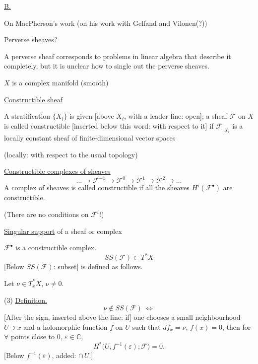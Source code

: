 \underline{B.}

On MacPherson's work (on his work with Gelfand and Vilonen(?))

Perverse sheaves?

A perverse sheaf corresponds to problems in linear algebra that describe it completely,
but it is unclear how to single out the perverse sheaves.

$X$ is a complex manifold (smooth)

\underline{Constructible sheaf}

A stratification $\{X_i\}$ is given [above $X_i$, with a leader line: open];
a sheaf $\mathcal{F}$ on $X$ is called constructible
[inserted below this word: with respect to it]
if $\mathcal{F}|_{X_i}$ is a locally constant sheaf of finite-dimensional vector spaces

(locally: with respect to the usual topology)

\underline{Constructible complexes of sheaves}
\begin{equation*}
\ldots\longrightarrow\mathcal{F}^{-1}
\longrightarrow\mathcal{F}^{0}
\longrightarrow\mathcal{F}^{1}
\longrightarrow\mathcal{F}^{2}\longrightarrow\ldots \tag{1}
\end{equation*}
A complex of sheaves is called constructible if all the sheaves
$H^{i}(\mathcal{F}^{\bullet})$ are constructible.

(There are no conditions on $\mathcal{F}^{i}$!)

\underline{Singular support} of a sheaf or complex

$\mathcal{F}^{\bullet}$ is a constructible complex.
\begin{equation*}
SS(\mathcal{F})\subset T^{*}X \tag{2}
\end{equation*}
[Below $SS(\mathcal{F})$: subset]
is defined as follows.

Let $\nu\in T_x^{*}X$, $\nu\ne0$.

(3) \underline{Definition.}
\begin{equation*}
\nu\notin SS(\mathcal{F})\ \Longleftrightarrow
\end{equation*}
[After the sign, inserted above the line: if]
one chooses a small neighbourhood $U\ni x$ and a holomorphic function $f$ on $U$
such that $df_x=\nu$, $f(x)=0$, then for $\forall$ points close to $0$,
$\varepsilon\in\mathbb{C}$,
\begin{equation*}
H^{*}\bigl(U,f^{-1}(\varepsilon);\mathcal{F}\bigr)=0. \tag{4}
\end{equation*}
[Below $f^{-1}(\varepsilon)$, added: $\cap\,U$.]

